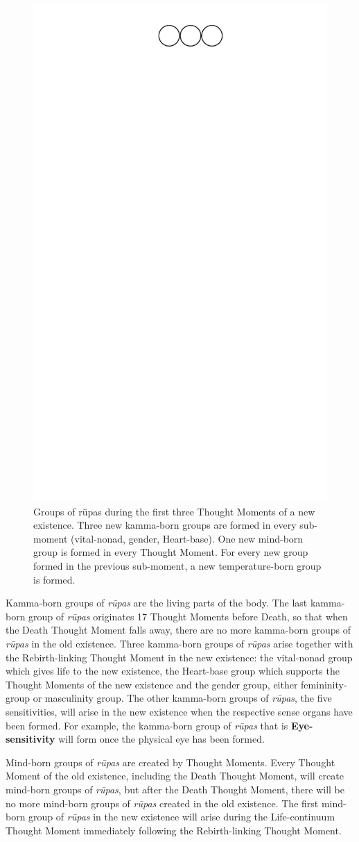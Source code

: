 \begin{figure}[h]
\centering
\includegraphics[width=0.5\linewidth]{./Diagrams/NewRupa}
\caption{Groups of rūpas during the first three Thought Moments of a new existence. Three new kamma-born groups are formed in every sub-moment (vital-nonad, gender, Heart-base). One new mind-born group is formed in every Thought Moment. For every new group formed in the previous sub-moment, a new temperature-born group is formed.}
\label{fig:NewRupa}
\end{figure}

Kamma-born groups of \textit{rūpas} are the living parts of the body. The last kamma-born group of \textit{rūpas} originates 17 Thought Moments before Death, so that when the Death Thought Moment falls away, there are no more kamma-born groups of \textit{rūpas} in the old existence. Three kamma-born groups of \textit{rūpas} arise together with the Rebirth-linking Thought Moment in the new existence: the vital-nonad group which gives life to the new existence, the Heart-base group which supports the Thought Moments of the new existence and the gender group, either femininity-group or masculinity group. The other kamma-born groups of \textit{rūpas}, the five sensitivities, will arise in the new existence when the respective sense organs have been formed. For example, the kamma-born group of \textit{rūpas} that is \textbf{Eye-sensitivity} will form once the physical eye has been formed.

Mind-born groups of \textit{rūpas} are created by Thought Moments. Every Thought Moment of the old existence, including the Death Thought Moment, will create mind-born groups of \textit{rūpas}, but after the Death Thought Moment, there will be no more mind-born groups of \textit{rūpas} created in the old existence. The first mind-born group of \textit{rūpas} in the new existence will arise during the Life-continuum Thought Moment immediately following the Rebirth-linking Thought Moment.

